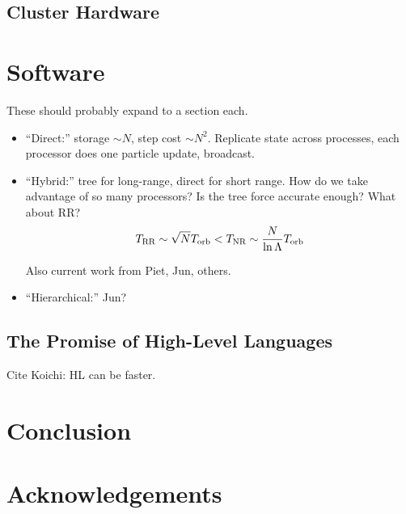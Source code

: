 \documentclass[5p,authoryear]{elsarticle}
\newcommand{\TRR}{T_{\textnormal{RR}}}
\newcommand{\Torb}{T_{\textnormal{orb}}}
\newcommand{\TNR}{T_{\textnormal{NR}}}
\begin{document}
\subsection{Cluster Hardware}

\section{Software}

These should probably expand to a section each.

\begin{itemize}
\item ``Direct:'' storage $\sim N$, step cost $\sim N^2$.  Replicate
  state across processes, each processor does one particle update,
  broadcast.
\item ``Hybrid:'' tree for long-range, direct for short range.  How do
  we take advantage of so many processors?  Is the tree force accurate
  enough?  What about RR?
  \begin{equation}
    \TRR \sim \sqrt{N} \Torb < \TNR \sim \frac{N}{\ln \Lambda} \Torb
  \end{equation}
  
  Also current work from Piet, Jun, others.
\item ``Hierarchical:'' Jun?
\end{itemize}

\subsection{The Promise of High-Level Languages}

Cite Koichi: HL can be faster.

\section{Conclusion}

\section*{Acknowledgements}



\end{document}
